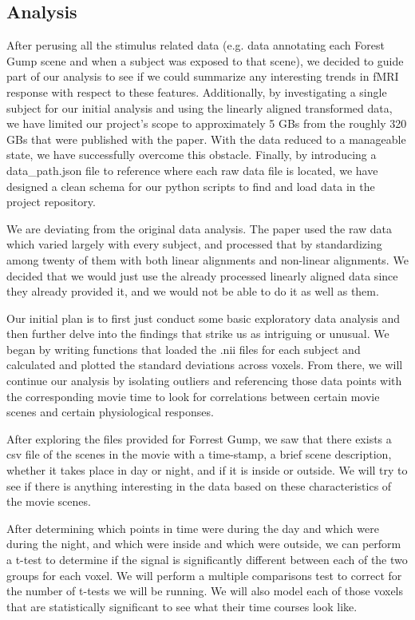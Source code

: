 \documentclass[11pt]{article}
\begin{document}
\subsection{Analysis}

After perusing all the stimulus related data (e.g. data
annotating each Forest Gump scene and when a subject was exposed to that
scene), we decided to guide part of our analysis to see if we could summarize
any interesting trends in fMRI response with respect to these features.
Additionally, by investigating a single subject for our initial analysis  and
using the linearly aligned transformed data, we have limited our project’s
scope to approximately 5 GBs from the roughly 320 GBs that were published with
the paper. With the data reduced to a manageable state, we have successfully
overcome this obstacle. Finally, by introducing a data\_path.json file to
reference where each raw data file is located, we have designed a clean schema
for our python scripts to find and load data in the project repository.

We are deviating from the original data analysis. The paper used the raw data
which varied largely with every subject, and processed that by standardizing
among twenty of them with both linear alignments and non-linear alignments. We
decided that we would just use the already processed linearly aligned data
since they already provided it, and we would not be able to do it as well as
them.

Our initial plan is to first just conduct some basic exploratory data analysis
and then further delve into the findings that strike us as intriguing or
unusual. We began by writing functions that loaded the .nii files for each
subject and calculated and plotted the standard deviations across voxels. From
there, we will continue our analysis by isolating outliers and referencing
those data points with the corresponding movie time to look for correlations
between certain movie scenes and certain physiological responses.

After exploring the files provided for Forrest Gump, we saw that there exists
a csv file of the scenes in the movie with a time-stamp, a brief scene
description, whether it takes place in day or night, and if it is inside or
outside. We will try to see if there is anything interesting in the data based
on these characteristics of the movie scenes.

After determining which points in time were during the day and which were
during the night, and which were inside and which were outside, we can perform
a t-test to determine if the signal is significantly different between each of
the two groups for each voxel.  We will perform a multiple comparisons test to
correct for the number of t-tests we will be running.   We will also model
each of those voxels that are statistically significant to see what their time
courses look like.
\end{document}
